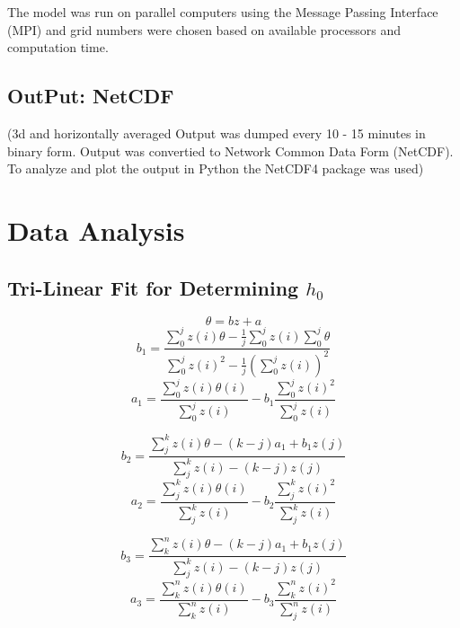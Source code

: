 The model was run on parallel computers using the Message Passing Interface
(MPI) and grid numbers were chosen based on available processors and computation
 time. 

\subsection{OutPut: NetCDF}

(3d and horizontally averaged Output was dumped every 10 - 15 minutes in binary form.  Output was convertied
to Network Common Data Form (NetCDF).  To analyze and plot the output in Python the NetCDF4 package was used)

\section{Data Analysis}
\label{sec:DataAnalysis}

\subsection{Tri-Linear Fit for Determining $h_{0}$}
\begin{equation}
\theta = bz + a 
\end{equation}
\begin{equation}
b_{1} = \frac{\sum^{j}_{0}z(i) \theta - \frac{1}{j}\sum^{j}_{0}z(i)\sum^{j}_{0}\theta}{\sum^{j}_{0}z(i)^{2} - \frac{1}{j}(\sum^{j}_{0}z(i))^{2}}
\end{equation}
\begin{equation}
a_{1} = \frac{\sum^{j}_{0}z(i)\theta(i)}{\sum^{j}_{0}z(i)} - b_{1}\frac{\sum^{j}_{0}z(i)^{2}}{\sum^{j}_{0}z(i)}
\end{equation}

\begin{equation}
b_{2} = \frac{\sum^{k}_{j}z(i) \theta - (k-j) a_{1}+b_{1}z(j)}{\sum^{k}_{j}z(i) - (k-j)z(j)}
\end{equation}
\begin{equation}
a_{2} = \frac{\sum^{k}_{j}z(i)\theta(i)}{\sum^{k}_{j}z(i)} - b_{2}\frac{\sum^{k}_{j}z(i)^{2}}{\sum^{k}_{j}z(i)}
\end{equation}

\begin{equation}
b_{3} = \frac{\sum^{n}_{k}z(i) \theta - (k-j) a_{1}+b_{1}z(j)}{\sum^{k}_{j}z(i) - (k-j)z(j)}
\end{equation}
\begin{equation}
a_{3} = \frac{\sum^{n}_{k}z(i)\theta(i)}{\sum^{n}_{k}z(i)} - b_{3}\frac{\sum^{n}_{k}z(i)^{2}}{\sum^{n}_{j}z(i)}
\end{equation}

